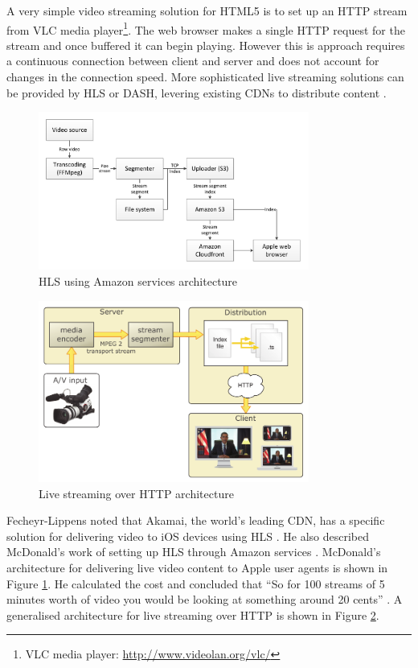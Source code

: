 \documentclass[journal]{IEEEtran}
\begin{document}
A very simple video streaming solution for HTML5 is to set up an HTTP stream from VLC media player\footnote{VLC media player: \url{http://www.videolan.org/vlc/}}. The web browser makes a single HTTP request for the stream and once buffered it can begin playing. However this is approach requires a continuous connection between client and server and does not account for changes in the connection speed. More sophisticated live streaming solutions can be provided by HLS or DASH, levering existing CDNs to distribute content \cite{techreport:aReviewOfHTTPLiveStreaming} \cite{inproceedings:dynamicAdapativeHTTPStreamingLive}. 

\begin{figure}[!t]
\centering
\includegraphics[width=3.5in]{streaming-diagram}
\caption{HLS using Amazon services architecture \cite{website:iPhoneHLSAmazon}}
\label{fig:hlsAmazonArch}
\end{figure} 

\begin{figure}[!t]
\centering
\includegraphics[width=3.5in]{streaming-architecture}
\caption{Live streaming over HTTP architecture \cite{techreport:aReviewOfHTTPLiveStreaming}}
\label{fig:HTTPLiveStreamingArch}
\end{figure}

Fecheyr-Lippens noted that Akamai, the world's leading CDN, has a specific solution for delivering video to iOS devices using HLS \cite{whitePaper:akamaiHDNetwork}\cite{techreport:aReviewOfHTTPLiveStreaming}. He also described McDonald's work of setting up HLS through Amazon services \cite{website:iPhoneHLSAmazon}. McDonald's architecture for delivering live video content to Apple user agents is shown in Figure \ref{fig:hlsAmazonArch}. He calculated the cost and concluded that ``So for 100 streams of 5 minutes worth of video you would be looking at something around 20 cents'' \cite{website:iPhoneHLSAmazon}. A generalised architecture for live streaming over HTTP is shown in Figure \ref{fig:HTTPLiveStreamingArch}.
\end{document}
